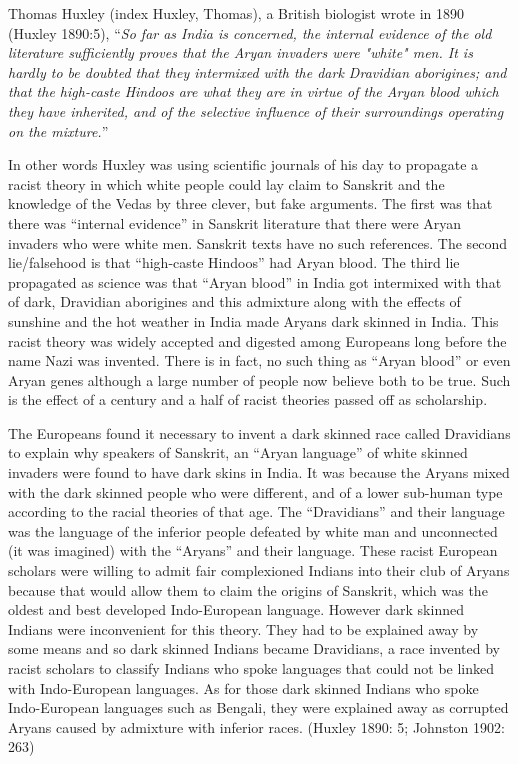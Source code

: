 Thomas Huxley (index Huxley, Thomas), a British biologist wrote in 1890 (Huxley 1890:5), “\textit{So far as India is concerned, the internal evidence of the old literature sufficiently proves that the Aryan invaders were "white" men. It is hardly to be doubted that they intermixed with the dark Dravidian aborigines; and that the high-caste Hindoos are what they are in virtue of the Aryan blood which they have inherited, and of the selective influence of their surroundings operating on the mixture.}”

In other words Huxley was using scientific journals of his day to propagate a racist theory in which white people could lay claim to Sanskrit and the knowledge of the Vedas by three clever, but fake arguments. The first was that there was “internal evidence” in Sanskrit literature that there were Aryan invaders who were white men. Sanskrit texts have no such references. The second lie/falsehood is that “high-caste Hindoos” had Aryan blood. The third lie propagated as science was that “Aryan blood” in India got intermixed with that of dark, Dravidian aborigines and this admixture along with the effects of sunshine and the hot weather in India made Aryans dark skinned in India. This racist theory was widely accepted and digested among Europeans long before the name Nazi was invented. There is in fact, no such thing as “Aryan blood” or even Aryan genes although a large number of people now believe both to be true. Such is the effect of a century and a half of racist theories passed off as scholarship.

The Europeans found it necessary to invent a dark skinned race called Dravidians to explain why speakers of Sanskrit, an “Aryan language” of white skinned invaders were found to have dark skins in India. It was because the Aryans mixed with the dark skinned people who were different, and of a lower sub-human type according to the racial theories of that age. The “Dravidians” and their language was the language of the inferior people defeated by white man and unconnected (it was imagined) with the “Aryans” and their language. These racist European scholars were willing to admit fair complexioned Indians into their club of Aryans because that would allow them to claim the origins of Sanskrit, which was the oldest and best developed Indo-European language. However dark skinned Indians were inconvenient for this theory. They had to be explained away by some means and so dark skinned Indians became Dravidians, a race invented by racist scholars to classify Indians who spoke languages that could not be linked with Indo-European languages. As for those dark skinned Indians who spoke Indo-European languages such as Bengali, they were explained away as corrupted Aryans caused by admixture with inferior races. (Huxley 1890: 5; Johnston 1902: 263)

